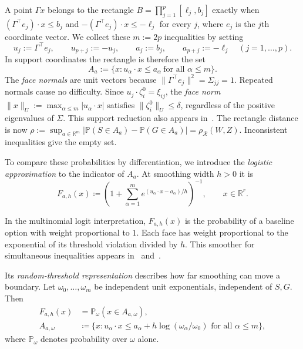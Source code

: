 \documentclass[11pt,letterpaper]{article}
\theoremstyle{remark}
\newcommand{\Pp}{\mathbb P}
\newcommand{\R}{\mathbb R}
\newcommand{\rh}{\rho_{\mathcal R}}
\begin{document}
A point \(\Gamma x\) belongs to the rectangle
\(B=\prod_{j=1}^p[\ell_j,b_j]\) exactly when
\((\Gamma^\top e_j)\cdot x\le b_j\) and
\(-(\Gamma^\top e_j)\cdot x\le-\ell_j\) for every \(j\), where \(e_j\)
is the \(j\)th coordinate vector. We collect these \(m:=2p\)
inequalities by setting
\[
 u_j:=\Gamma^\top e_j,\qquad u_{p+j}:=-u_j,\qquad
 a_j:=b_j,\qquad a_{p+j}:=-\ell_j\quad (j=1,\ldots,p).
\]
In support coordinates the rectangle is therefore the set
\[
 A_a:=\{x:u_\alpha\cdot x\le a_\alpha\ \text{for all }\alpha\le m\}.
\]
The \emph{face normals} are unit vectors because
\(\|\Gamma^\top e_j\|^2=\Sigma_{jj}=1\). Repeated normals cause no
difficulty. Since \(u_j\cdot\zeta_i^0=\xi_{ij}\), the \emph{face norm}
\(\|x\|_U:=\max_{\alpha\le m}|u_\alpha\cdot x|\) satisfies
\(\|\zeta_i^0\|_U\le\delta\), regardless of the positive eigenvalues
of \(\Sigma\). This support reduction also appears in~\cite[Section~2.3]{GaoZhang}.
The rectangle distance is now
\(\rho:=\sup_{a\in\R^m}|\Pp(S\in A_a)-\Pp(G\in A_a)|=\rh(W,Z)\).
Inconsistent inequalities give the empty set.

To compare these probabilities by differentiation, we introduce the
\emph{logistic approximation} to the indicator of \(A_a\). At smoothing
width \(h>0\) it is
\begin{equation}
 F_{a,h}(x)\coloneqq
 \left(1+\sum_{\alpha=1}^m
 e^{(u_\alpha\cdot x-a_\alpha)/h}\right)^{-1},
 \qquad x\in\R^r.
 \label{eq:selector}
\end{equation}

In the multinomial logit interpretation, \(F_{a,h}(x)\) is the probability
of a baseline option with weight proportional to \(1\). Each face has
weight proportional to the exponential of its threshold violation divided
by \(h\). This smoother for simultaneous inequalities appears
in~\cite[p.~1001]{McFadden1989} and~\cite[eq.~(5)]{GaoZhang}.

Its \emph{random-threshold representation} describes how far smoothing
can move a boundary. Let \(\omega_0,\ldots,\omega_m\) be independent
unit exponentials, independent of \(S,G\). Then
\begin{equation}
 \begin{split}
 F_{a,h}(x)&=\Pp_\omega(x\in A_{a,\omega}),\\
 A_{a,\omega}&\coloneqq\{x:u_\alpha\cdot x\le
 a_\alpha+h\log(\omega_\alpha/\omega_0)
                   \text{ for all }\alpha\le m\},
 \end{split}
 \label{eq:mixture}
\end{equation}
where $\Pp_\omega$ denotes probability over $\omega$ alone. 
\end{document}

